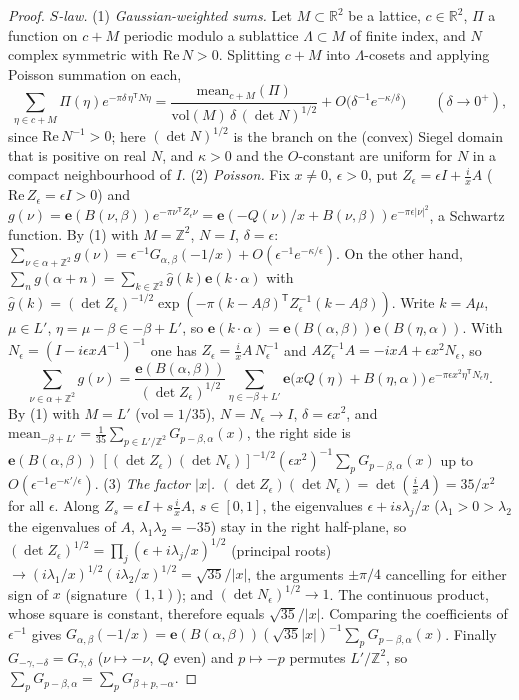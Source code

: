 \documentclass[11pt]{article}
\theoremstyle{definition}
\theoremstyle{plain}
\newcommand{\Z}{\mathbb{Z}}
\newcommand{\R}{\mathbb{R}}
\newcommand{\e}{\mathbf{e}}
\begin{document}
\begin{proof}
\emph{$S$-law.} (1) \emph{Gaussian-weighted sums.} Let $M\subset\R^2$ be a lattice, $c\in\R^2$, $\Pi$ a function on $c+M$ periodic modulo a
sublattice $\Lambda\subset M$ of finite index, and $N$ complex symmetric with $\mathrm{Re}\,N>0$. Splitting $c+M$ into $\Lambda$-cosets and applying
Poisson summation on each,
\[
\sum_{\eta\in c+M}\Pi(\eta)e^{-\pi\delta\,\eta^{\mathsf T}N\eta}=\frac{\mathrm{mean}_{c+M}(\Pi)}{\mathrm{vol}(M)\,\delta\,(\det N)^{1/2}}+O\bigl(\delta^{-1}e^{-\kappa/\delta}\bigr)
\qquad(\delta\to0^+),
\]
since $\mathrm{Re}\,N^{-1}>0$; here $(\det N)^{1/2}$ is the branch on the (convex) Siegel domain that is positive on real $N$, and $\kappa>0$ and the
$O$-constant are uniform for $N$ in a compact neighbourhood of $I$.
(2) \emph{Poisson.} Fix $x\ne0$, $\epsilon>0$, put $Z_\epsilon=\epsilon I+\tfrac ixA$ ($\mathrm{Re}\,Z_\epsilon=\epsilon I>0$) and
$g(\nu)=\e(B(\nu,\beta))e^{-\pi\nu^{\mathsf T}Z_\epsilon\nu}=\e(-Q(\nu)/x+B(\nu,\beta))e^{-\pi\epsilon|\nu|^2}$, a Schwartz function. By (1) with
$M=\Z^2$, $N=I$, $\delta=\epsilon$: $\sum_{\nu\in\alpha+\Z^2}g(\nu)=\epsilon^{-1}G_{\alpha,\beta}(-1/x)+O(\epsilon^{-1}e^{-\kappa/\epsilon})$.
On the other hand, $\sum_ng(\alpha+n)=\sum_{k\in\Z^2}\widehat g(k)\e(k\cdot\alpha)$ with
$\widehat g(k)=(\det Z_\epsilon)^{-1/2}\exp(-\pi(k-A\beta)^{\mathsf T}Z_\epsilon^{-1}(k-A\beta))$. Write $k=A\mu$, $\mu\in L'$, $\eta=\mu-\beta\in-\beta+L'$,
so $\e(k\cdot\alpha)=\e(B(\alpha,\beta))\e(B(\eta,\alpha))$. With $N_\epsilon=(I-i\epsilon xA^{-1})^{-1}$ one has
$Z_\epsilon=\tfrac ixA\,N_\epsilon^{-1}$ and $AZ_\epsilon^{-1}A=-ixA+\epsilon x^2N_\epsilon$, so
\[
\sum_{\nu\in\alpha+\Z^2}g(\nu)=\frac{\e(B(\alpha,\beta))}{(\det Z_\epsilon)^{1/2}}\sum_{\eta\in-\beta+L'}\e\bigl(xQ(\eta)+B(\eta,\alpha)\bigr)\,
e^{-\pi\epsilon x^2\eta^{\mathsf T}N_\epsilon\eta}.
\]
By (1) with $M=L'$ ($\mathrm{vol}=1/35$), $N=N_\epsilon\to I$, $\delta=\epsilon x^2$, and
$\mathrm{mean}_{-\beta+L'}=\tfrac1{35}\sum_{p\in L'/\Z^2}G_{p-\beta,\alpha}(x)$, the right side is
$\e(B(\alpha,\beta))\,[(\det Z_\epsilon)(\det N_\epsilon)]^{-1/2}(\epsilon x^2)^{-1}\sum_pG_{p-\beta,\alpha}(x)$ up to $O(\epsilon^{-1}e^{-\kappa'/\epsilon})$.
(3) \emph{The factor $|x|$.} $(\det Z_\epsilon)(\det N_\epsilon)=\det(\tfrac ixA)=35/x^2$ for all $\epsilon$. Along $Z_{s}=\epsilon I+s\tfrac ixA$, $s\in[0,1]$,
the eigenvalues $\epsilon+is\lambda_j/x$ ($\lambda_1>0>\lambda_2$ the eigenvalues of $A$, $\lambda_1\lambda_2=-35$) stay in the right half-plane, so
$(\det Z_\epsilon)^{1/2}=\prod_j(\epsilon+i\lambda_j/x)^{1/2}$ (principal roots) $\to(i\lambda_1/x)^{1/2}(i\lambda_2/x)^{1/2}=\sqrt{35}/|x|$, the arguments
$\pm\pi/4$ cancelling for either sign of $x$ (signature $(1,1)$); and $(\det N_\epsilon)^{1/2}\to1$. The continuous product, whose square is
constant, therefore equals $\sqrt{35}/|x|$. Comparing the coefficients of $\epsilon^{-1}$ gives
$G_{\alpha,\beta}(-1/x)=\e(B(\alpha,\beta))(\sqrt{35}|x|)^{-1}\sum_pG_{p-\beta,\alpha}(x)$. Finally $G_{-\gamma,-\delta}=G_{\gamma,\delta}$ ($\nu\mapsto-\nu$,
$Q$ even) and $p\mapsto-p$ permutes $L'/\Z^2$, so $\sum_pG_{p-\beta,\alpha}=\sum_pG_{\beta+p,-\alpha}$.
\end{proof}
\end{document}

